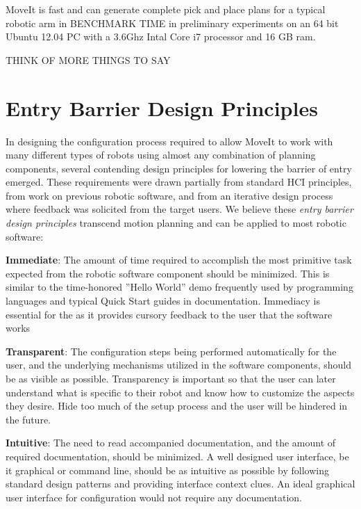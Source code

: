 \documentclass[10pt,journal,compsoc]{joser1}
\begin{document}
{MoveIt is fast and can generate complete pick and place plans for a typical robotic arm in BENCHMARK TIME in preliminary experiments on an 64 bit Ubuntu 12.04 PC with a 3.6Ghz Intal Core i7 processor and 16 GB ram.

THINK OF MORE THINGS TO SAY

\section{Entry Barrier Design Principles}
\label{sec::requirements}

In designing the configuration process required to allow MoveIt to work with many different types of robots using almost any combination of planning components, several contending design principles for lowering the barrier of entry emerged. These requirements were drawn partially from standard HCI principles, from work on previous robotic software, and from an iterative design process where feedback was solicited from the target users. We believe these \textit{entry barrier design principles} transcend motion planning and can be applied to most robotic software:

{\bf Immediate}: The amount of time required to accomplish the most primitive task expected from the robotic software component should be minimized. This is similar to the time-honored ''Hello World'' demo frequently used by programming languages and typical Quick Start guides in documentation. Immediacy is essential for the  as it provides cursory feedback to the user that the software works

{\bf Transparent}: The configuration steps being performed automatically for the user, and the underlying mechanisms utilized in the software components, should be as visible as possible. Transparency is important so that the user can later understand what is specific to their robot and know how to customize the aspects they desire. Hide too much of the setup process and the user will be hindered in the future.

{\bf Intuitive}: The need to read accompanied documentation, and the amount of required documentation, should be minimized. A well designed user interface, be it graphical or command line, should be as intuitive as possible by following standard design patterns and providing interface context clues. An ideal graphical user interface for configuration would not require any documentation.

}
\end{document}
